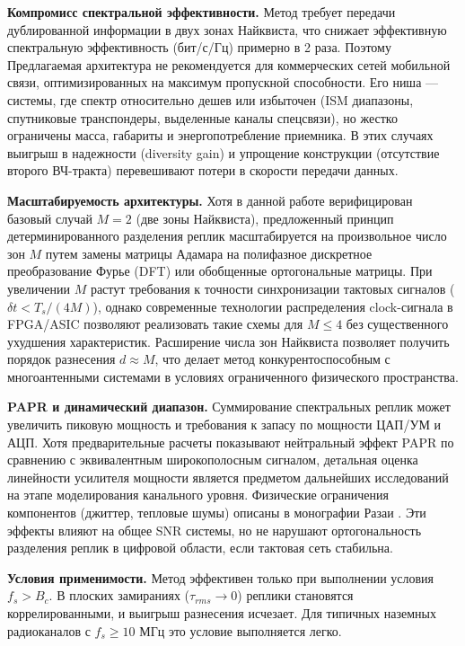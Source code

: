 \documentclass[a4paper,12pt]{article}
\numberwithin{equation}{section}
\begin{document}
\textbf{Компромисс спектральной эффективности.} Метод требует передачи дублированной информации в двух зонах Найквиста, что снижает эффективную спектральную эффективность (бит/с/Гц) примерно в 2 раза. Поэтому Предлагаемая архитектура не рекомендуется для коммерческих сетей мобильной связи, оптимизированных на максимум пропускной способности. Его ниша — системы, где спектр относительно дешев или избыточен (ISM диапазоны, спутниковые транспондеры, выделенные каналы спецсвязи), но жестко ограничены масса, габариты и энергопотребление приемника. В этих случаях выигрыш в надежности (diversity gain) и упрощение конструкции (отсутствие второго ВЧ-тракта) перевешивают потери в скорости передачи данных.

\textbf{Масштабируемость архитектуры.} Хотя в данной работе верифицирован базовый случай $M=2$ (две зоны Найквиста), предложенный принцип детерминированного разделения реплик масштабируется на произвольное число зон $M$ путем замены матрицы Адамара на полифазное дискретное преобразование Фурье (DFT) или обобщенные ортогональные матрицы. При увеличении $M$ растут требования к точности синхронизации тактовых сигналов ($\delta t < T_s/(4M)$), однако современные технологии распределения clock-сигнала в FPGA/ASIC позволяют реализовать такие схемы для $M \le 4$ без существенного ухудшения характеристик. Расширение числа зон Найквиста позволяет получить порядок разнесения $d \approx M$, что делает метод конкурентоспособным с многоантенными системами в условиях ограниченного физического пространства.

\textbf{PAPR и динамический диапазон.} Суммирование спектральных реплик может увеличить пиковую мощность и требования к запасу по мощности ЦАП/УМ и АЦП. Хотя предварительные расчеты показывают нейтральный эффект PAPR по сравнению с эквивалентным широкополосным сигналом, детальная оценка линейности усилителя мощности является предметом дальнейших исследований на этапе моделирования канального уровня. Физические ограничения компонентов (джиттер, тепловые шумы) описаны в монографии Разаи \cite{razavi}. Эти эффекты влияют на общее SNR системы, но не нарушают ортогональность разделения реплик в цифровой области, если тактовая сеть стабильна.

\textbf{Условия применимости.} Метод эффективен только при выполнении условия $f_s > B_c$. В плоских замираниях ($\tau_{rms} \to 0$) реплики становятся коррелированными, и выигрыш разнесения исчезает. Для типичных наземных радиоканалов с $f_s \ge 10$ МГц это условие выполняется легко.
\end{document}
